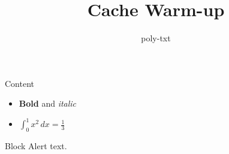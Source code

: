 \documentclass{beamer}
\title{Cache Warm-up}
\author{poly-txt}
\begin{document}
\begin{frame}
  \titlepage
\end{frame}
\begin{frame}{Content}
  \begin{itemize}
    \item \textbf{Bold} and \textit{italic}
    \item $\int_0^1 x^2 \, dx = \frac{1}{3}$
  \end{itemize}
  \begin{block}{Block}
    \alert{Alert} text.
  \end{block}
\end{frame}
\end{document}
